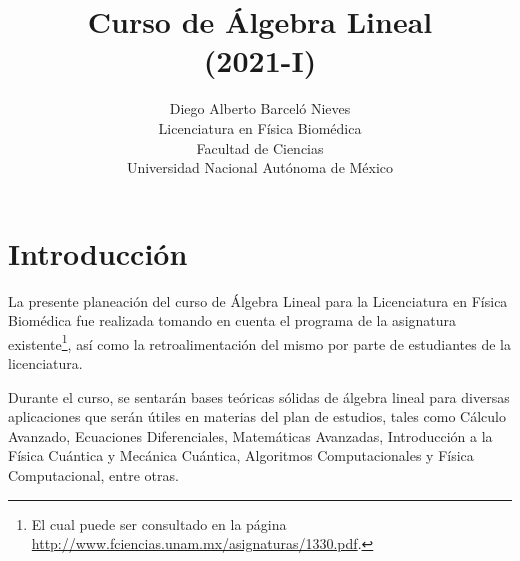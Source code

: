 \documentclass[12pt,dvipsnames]{article}
\begin{document}
\title{Curso de Álgebra Lineal \\ (2021-I)}
\author{Diego Alberto Barceló Nieves\\ Licenciatura en Física Biomédica \\ Facultad de Ciencias \\ Universidad Nacional Autónoma de México}
\date{}
\maketitle

\section{Introducción}

La presente planeación del curso de Álgebra Lineal para la Licenciatura en Física Biomédica fue realizada tomando en cuenta el programa de la asignatura existente\footnote{El cual puede ser consultado en la página \url{http://www.fciencias.unam.mx/asignaturas/1330.pdf}.}, así como la retroalimentación del mismo por parte de estudiantes de la licenciatura.


Durante el curso, se sentarán bases teóricas sólidas de álgebra lineal para diversas aplicaciones que serán útiles en materias del plan de estudios, tales como Cálculo Avanzado, Ecuaciones Diferenciales, Matemáticas Avanzadas, Introducción a la Física Cuántica y Mecánica Cuántica, Algoritmos Computacionales y Física Computacional, entre otras.
\end{document}
